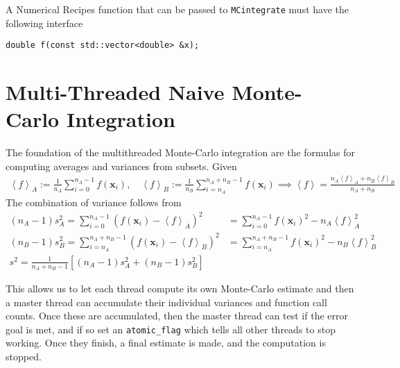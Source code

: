 \documentclass[landscape]{article}
\numberwithin{equation}{section}
\begin{document}
A Numerical Recipes function that can be passed to \texttt{MCintegrate} must have the following interface
\begin{verbatim}
double f(const std::vector<double> &x);
\end{verbatim}


\section{Multi-Threaded Naive Monte-Carlo Integration}

The foundation of the multithreaded Monte-Carlo integration are the formulas for computing averages and variances from subsets.
Given
\begin{align*}
\left<f\right>_{A} := \frac{1}{n_{A}} \sum_{i=0}^{n_{A}-1} f(\mathbf{x}_{i}),
\quad
\left<f\right>_{B} := \frac{1}{n_{B}} \sum_{i=n_{A}}^{n_{A}+n_{B}-1} f(\mathbf{x}_{i})
\implies
\left<f\right> = \frac{n_{A}\left<f\right>_{A} + n_{B}\left<f\right>_{B}}{n_{A} + n_{B}}
\end{align*}
The combination of variance follows from
\begin{align*}
(n_{A}-1)s_{A}^{2} = \sum_{i=0}^{n_{A} -1} (f(\mathbf{x}_{i}) - \left<f\right>_{A})^{2} &= \sum_{i=0}^{n_{A} -1} f(\mathbf{x}_{i})^{2}   - n_{A}\left<f\right>_{A}^{2} \\
(n_{B}-1)s_{B}^{2} = \sum_{i=n_{A}}^{n_{A} +n_{B}-1} (f(\mathbf{x}_{i}) - \left<f\right>_{B})^{2} &= \sum_{i=n_{A}}^{n_{A}  + n_{B}-1} f(\mathbf{x}_{i})^{2}   - n_{B}\left<f\right>_{B}^{2} \\
s^{2} = \frac{1}{n_{A} + n_{B}-1} \left[ (n_A-1)s_{A}^{2} + (n_B-1)s_{B}^2\right]
\end{align*}

This allows us to let each thread compute its own Monte-Carlo estimate and then a master thread can accumulate their individual variances and function call counts.
Once these are accumulated, then the master thread can test if the error goal is met, and if so set an \texttt{atomic\_flag} which tells all other threads to stop working.
Once they finish, a final estimate is made, and the computation is stopped.
\end{document}
